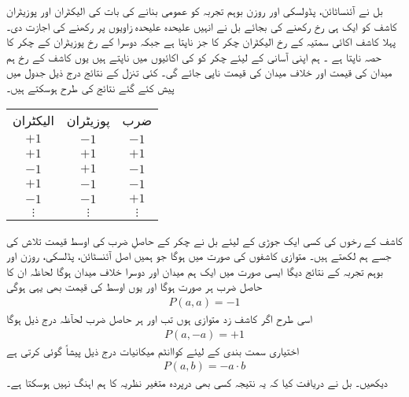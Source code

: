بل نے آئنساٹائن، پڈولسکی اور روزن بوہم تجربہ کو عمومی بنانے کی بات کی الیکٹران اور پوزیٹران کاشف کو ایک ہی رخ رکھنے کی بجائے بل نے انہیں علیحدہ علیحدہ زاویوں پر رکھنے کی اجازت دی۔ پہلا کاشف اکائی سمتیہ   کے رخ الیکٹران چکر کا جز ناپتا ہے جبکہ دوسرا  کے رخ پوزیٹران کے چکر کا حصہ ناپتا ہے ۔ ہم اپنی آسانی کے لیئے چکر کو  کی اکائیوں میں ناپتے ہیں یوں کاشف کے رخ ہم میدان کی قیمت  اور خلاف میدان کی قیمت  ناپی جائے گی۔ کئی  تنزل کے نتائج درج ذیل جدول میں پیش کئے گئے نتائج کی طرح ہوسکتے ہیں۔
\begin{table}[h!]
\begin{center}
\begin{tabular}{|c c c|}
\hline
الیکٹران & پوزیٹران & ضرب \\
$+1$ & $-1$ & $-1$ \\
$+1$ & $+1$ & $+1$ \\
$-1$ & $+1$ & $-1$ \\
$+1$ & $-1$ & $-1$ \\
$-1$ & $-1$ & $+1$ \\
$\vdots$ & $\vdots$ & $\vdots$ \\
\hline
\end{tabular}
\end{center}
\end{table}
کاشف کے رخوں کی کسی ایک جوڑی کے لیئے بل نے چکر کے حاصلِ ضرب کی اوسط قیمت تلاش کی جسے ہم  لکھتے ہیں۔ متوازی کاشفوں کی صورت میں  ہوگا جو ہمیں اصل آئنسٹائن، پڈلسکی، روزن اور بوہم تجربہ کے نتائج دیگا ایسی صورت میں ایک ہم میدان اور دوسرا خلاف میدان ہوگا لحاظہ ان کا حاصل ضرب ہر صورت  ہوگا اور یوں اوسط کی قیمت بھی یہی ہوگی
\begin{align}
	P(a, a) = -1
\end{align}
اسی طرح اگر کاشف زد متوازی ہوں تب  اور ہر حاصل ضرب  لحآظہ درج ذیل ہوگا
\begin{align}
	P(a, -a) = +1
\end{align}
اختیاری سمت بندی کے لیئے کواانٹم میکانیات درج ذیل پیشاً گوئی کرتی ہے
\begin{align}
	P(a, b) = -a\cdot b
\end{align}
 دیکھیں۔ بل نے دریافت کیا کہ یہ نتیجہ کسی بھی درپردہ متغیر نظریہ کا ہم اہنگ نہیں ہوسکتا ہے۔

